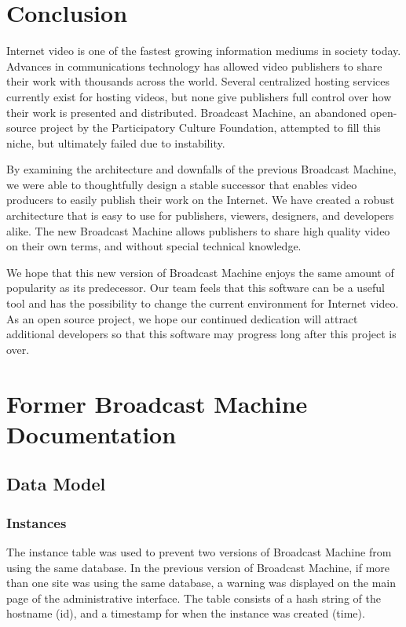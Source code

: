 \documentclass[a4paper,12pt]{report}
\begin{document}
\chapter{Conclusion}
Internet video is one of the fastest growing information mediums in society today. Advances in communications technology has allowed video publishers to share their work with thousands across the world. Several centralized hosting services currently exist for hosting videos, but none give publishers full control over how their work is presented and distributed. Broadcast Machine, an abandoned open-source project by the Participatory Culture Foundation, attempted to fill this niche, but ultimately failed due to instability.

By examining the architecture and downfalls of the previous Broadcast Machine, we were able to thoughtfully design a stable successor that 
enables video producers to easily publish their work on the Internet. We have created a robust architecture that is easy to use for publishers, viewers, designers, and developers alike. The new Broadcast Machine allows publishers to share high quality video on their own terms, and without special technical knowledge.

We hope that this new version of Broadcast Machine enjoys the same amount of popularity as its predecessor.
Our team feels that this software can be a useful tool and has the possibility to change the current environment for Internet video.
As an open source project, we hope our continued dedication will attract additional developers so that this software may progress long after this project is over.

\appendix
\chapter{Former Broadcast Machine Documentation}

\section{Data Model}


\subsection{Instances}
The instance table was used to prevent two versions of Broadcast Machine from using the same database. In the previous version of Broadcast Machine, if more than one site was using the same database, a warning was displayed on the main page of the administrative interface. The table consists of a hash string of the hostname (id), and a timestamp for when the instance was created (time). 
\end{document}
